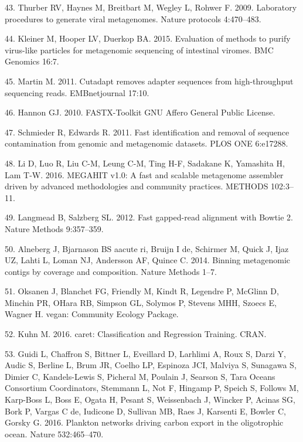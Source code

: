 \documentclass[12pt,]{article}
\begin{document}
\hypertarget{ref-Thurber:2009dn}{}
43. Thurber RV, Haynes M, Breitbart M, Wegley L, Rohwer F. 2009.
Laboratory procedures to generate viral metagenomes. Nature protocols
4:470--483.

\hypertarget{ref-Kleiner:2015kd}{}
44. Kleiner M, Hooper LV, Duerkop BA. 2015. Evaluation of methods to
purify virus-like particles for metagenomic sequencing of intestinal
viromes. BMC Genomics 16:7.

\hypertarget{ref-Martin:2011eu}{}
45. Martin M. 2011. Cutadapt removes adapter sequences from
high-throughput sequencing reads. EMBnetjournal 17:10.

\hypertarget{ref-FASTXToolkit:wr}{}
46. Hannon GJ. 2010. FASTX-Toolkit GNU Affero General Public License.

\hypertarget{ref-Schmieder:2011fo}{}
47. Schmieder R, Edwards R. 2011. Fast identification and removal of
sequence contamination from genomic and metagenomic datasets. PLOS ONE
6:e17288.

\hypertarget{ref-Li:2016kd}{}
48. Li D, Luo R, Liu C-M, Leung C-M, Ting H-F, Sadakane K, Yamashita H,
Lam T-W. 2016. MEGAHIT v1.0: A fast and scalable metagenome assembler
driven by advanced methodologies and community practices. METHODS
102:3--11.

\hypertarget{ref-Langmead:2012jh}{}
49. Langmead B, Salzberg SL. 2012. Fast gapped-read alignment with
Bowtie 2. Nature Methods 9:357--359.

\hypertarget{ref-Alneberg:2014fc}{}
50. Alneberg J, Bjarnason BS aacute ri, Bruijn I de, Schirmer M, Quick
J, Ijaz UZ, Lahti L, Loman NJ, Andersson AF, Quince C. 2014. Binning
metagenomic contigs by coverage and composition. Nature Methods 1--7.

\hypertarget{ref-veganCommunityEco:xdLliqSE}{}
51. Oksanen J, Blanchet FG, Friendly M, Kindt R, Legendre P, McGlinn D,
Minchin PR, OHara RB, Simpson GL, Solymos P, Stevens MHH, Szoecs E,
Wagner H. vegan: Community Ecology Package.

\hypertarget{ref-caretClassificatio:ux5fU2Litux5f1}{}
52. Kuhn M. 2016. caret: Classification and Regression Training. CRAN.

\hypertarget{ref-Guidi:2016kf}{}
53. Guidi L, Chaffron S, Bittner L, Eveillard D, Larhlimi A, Roux S,
Darzi Y, Audic S, Berline L, Brum JR, Coelho LP, Espinoza JCI, Malviya
S, Sunagawa S, Dimier C, Kandels-Lewis S, Picheral M, Poulain J, Searson
S, Tara Oceans Consortium Coordinators, Stemmann L, Not F, Hingamp P,
Speich S, Follows M, Karp-Boss L, Boss E, Ogata H, Pesant S, Weissenbach
J, Wincker P, Acinas SG, Bork P, Vargas C de, Iudicone D, Sullivan MB,
Raes J, Karsenti E, Bowler C, Gorsky G. 2016. Plankton networks driving
carbon export in the oligotrophic ocean. Nature 532:465--470.
\end{document}
